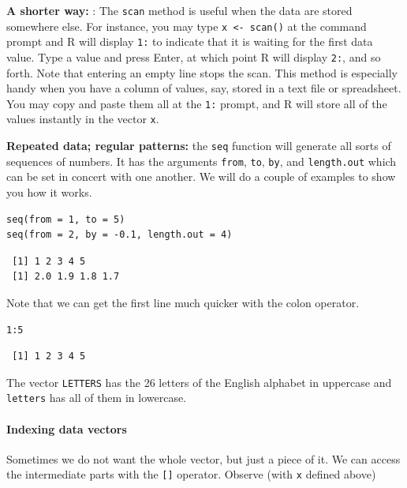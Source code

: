 \documentclass[captions=tableheading]{scrbook}
\begin{document}
\textbf{A shorter way:} : The \texttt{scan} method is useful when the data are stored somewhere else. For instance, you may type \texttt{x <- scan()} at the command prompt and \textsf{R} will display \texttt{1:} to indicate that it is waiting for the first data value. Type a value and press \textsf{Enter}, at which point \textsf{R} will display \texttt{2:}, and so forth. Note that entering an empty line stops the scan. This method is especially handy when you have a column of values, say, stored in a text file or spreadsheet. You may copy and paste them all at the \texttt{1:} prompt, and \textsf{R} will store all of the values instantly in the vector \texttt{x}. 

\textbf{Repeated data; regular patterns:} the \texttt{seq} function will generate all sorts of sequences of numbers. It has the arguments \texttt{from}, \texttt{to}, \texttt{by}, and \texttt{length.out} which can be set in concert with one another. We will do a couple of examples to show you how it works.


\begin{verbatim}
seq(from = 1, to = 5)
seq(from = 2, by = -0.1, length.out = 4)
\end{verbatim}

\begin{verbatim}
 [1] 1 2 3 4 5
 [1] 2.0 1.9 1.8 1.7
\end{verbatim}

Note that we can get the first line much quicker with the colon operator.


\begin{verbatim}
1:5
\end{verbatim}

\begin{verbatim}
 [1] 1 2 3 4 5
\end{verbatim}

The vector \texttt{LETTERS} has the 26 letters of the English alphabet in uppercase and \texttt{letters} has all of them in lowercase.


\paragraph*{Indexing data vectors}

Sometimes we do not want the whole vector, but just a piece of it. We can access the intermediate parts with the \texttt{[]} operator. Observe (with \texttt{x} defined above)
\end{document}
